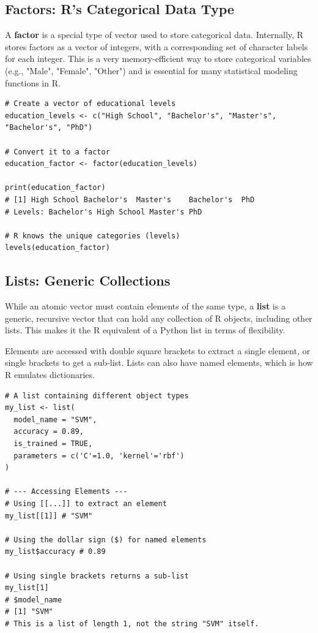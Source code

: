 \subsection*{Factors: R's Categorical Data Type}
A \textbf{factor} is a special type of vector used to store categorical data. Internally, R stores factors as a vector of integers, with a corresponding set of character labels for each integer. This is a very memory-efficient way to store categorical variables (e.g., "Male", "Female", "Other") and is essential for many statistical modeling functions in R.

\begin{verbatim}
# Create a vector of educational levels
education_levels <- c("High School", "Bachelor's", "Master's", "Bachelor's", "PhD")

# Convert it to a factor
education_factor <- factor(education_levels)

print(education_factor)
# [1] High School Bachelor's  Master's    Bachelor's  PhD
# Levels: Bachelor's High School Master's PhD

# R knows the unique categories (levels)
levels(education_factor)
\end{verbatim}

\subsection*{Lists: Generic Collections}
While an atomic vector must contain elements of the same type, a \textbf{list} is a generic, recursive vector that can hold any collection of R objects, including other lists. This makes it the R equivalent of a Python list in terms of flexibility.

Elements are accessed with double square brackets \rcode{[[...]]} to extract a single element, or single brackets \rcode{[...]} to get a sub-list. Lists can also have named elements, which is how R emulates dictionaries.

\begin{example}
\text{ }\begin{verbatim}
# A list containing different object types
my_list <- list(
  model_name = "SVM",
  accuracy = 0.89,
  is_trained = TRUE,
  parameters = c('C'=1.0, 'kernel'='rbf')
)

# --- Accessing Elements ---
# Using [[...]] to extract an element
my_list[[1]] # "SVM"

# Using the dollar sign ($) for named elements
my_list$accuracy # 0.89

# Using single brackets returns a sub-list
my_list[1]
# $model_name
# [1] "SVM"
# This is a list of length 1, not the string "SVM" itself.
\end{verbatim}
\end{example}

